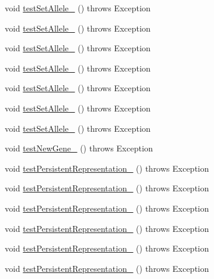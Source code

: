 \begin{DoxyCompactItemize}
void \hyperlink{classorg_1_1jgap_1_1impl_1_1_string_gene_test_a2834e40a3b05380e92c3831ca04cb972}{test\-Set\-Allele\-\_} ()  throws Exception 
\item 
void \hyperlink{classorg_1_1jgap_1_1impl_1_1_string_gene_test_a834b772338444e680b57496d694a2a4e}{test\-Set\-Allele\-\_} ()  throws Exception 
\item 
void \hyperlink{classorg_1_1jgap_1_1impl_1_1_string_gene_test_ae8117a6a764a53bce91b72de50dcbcc0}{test\-Set\-Allele\-\_} ()  throws Exception 
\item 
void \hyperlink{classorg_1_1jgap_1_1impl_1_1_string_gene_test_ad066bda1e537ee569a21da45fc1d27e7}{test\-Set\-Allele\-\_} ()  throws Exception 
\item 
void \hyperlink{classorg_1_1jgap_1_1impl_1_1_string_gene_test_a5d5613523a6907511abb8c6595e61892}{test\-Set\-Allele\-\_} ()  throws Exception 
\item 
void \hyperlink{classorg_1_1jgap_1_1impl_1_1_string_gene_test_abaa2315888b8cf853bb80be2ec7d94b3}{test\-Set\-Allele\-\_} ()  throws Exception 
\item 
void \hyperlink{classorg_1_1jgap_1_1impl_1_1_string_gene_test_ab720850230f7234b979e2b84a5483962}{test\-Set\-Allele\-\_} ()  throws Exception 
\item 
void \hyperlink{classorg_1_1jgap_1_1impl_1_1_string_gene_test_a8f3f7adbe4432d52375081b2b47e4c18}{test\-New\-Gene\-\_} ()  throws Exception 
\item 
void \hyperlink{classorg_1_1jgap_1_1impl_1_1_string_gene_test_a07cb23dd2d372a1f37c2a4d3cdaa0fae}{test\-Persistent\-Representation\-\_} ()  throws Exception 
\item 
void \hyperlink{classorg_1_1jgap_1_1impl_1_1_string_gene_test_abd59e173306d5dfb27dc180155b82f8b}{test\-Persistent\-Representation\-\_} ()  throws Exception 
\item 
void \hyperlink{classorg_1_1jgap_1_1impl_1_1_string_gene_test_a4bf98f891ab5d92a3f0860d9f296aa1a}{test\-Persistent\-Representation\-\_} ()  throws Exception 
\item 
void \hyperlink{classorg_1_1jgap_1_1impl_1_1_string_gene_test_a40c9a86598812f90fa50e729eb75430a}{test\-Persistent\-Representation\-\_} ()  throws Exception 
\item 
void \hyperlink{classorg_1_1jgap_1_1impl_1_1_string_gene_test_a041bc2e94acfe254a98841d6e09f421a}{test\-Persistent\-Representation\-\_} ()  throws Exception 
\item 
void \hyperlink{classorg_1_1jgap_1_1impl_1_1_string_gene_test_a7def9d23e7c8b19def106b51e2436361}{test\-Persistent\-Representation\-\_} ()  throws Exception 

\end{DoxyCompactItemize}
